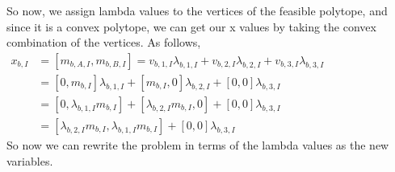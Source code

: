 \documentclass[11pt]{article}
\begin{document}
\noindent So now, we assign lambda values to the vertices of the feasible polytope, and since it is a convex polytope, we can get our x values by taking the convex combination of the vertices. As follows, 
\\

$ 
\begin{aligned}
x_{b,I} &= [m_{b,A,I}, m_{b,B,I}]= v_{b,1,I} \lambda_{b,1,I} + v_{b,2,I} \lambda_{b,2,I} + v_{b,3,I} \lambda_{b,3,I}  \\
&= [0, m_{b,I}] \lambda_{b,1,I} + [m_{b,I}, 0] \lambda_{b,2,I} + [0,0] \lambda_{b,3,I}\\
&= [0, \lambda_{b,1,I} m_{b,I}] + [\lambda_{b,2,I} m_{b,I}, 0] + [0,0] \lambda_{b,3,I}\\
&= [\lambda_{b,2,I} m_{b,I}, \lambda_{b,1,I} m_{b,I}] + [0,0] \lambda_{b,3,I}
\end{aligned}
$
\\

\noindent So now we can rewrite the problem in terms of the lambda values as the new variables.\\
\end{document}
